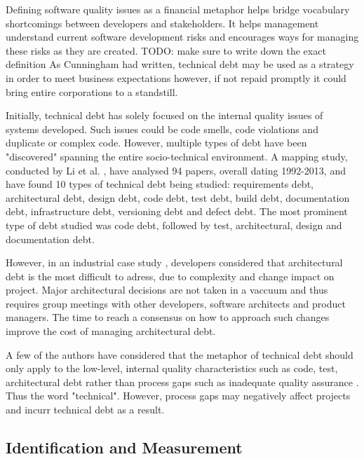 \documentclass{mprop}
\begin{document}
Defining software quality issues as a financial metaphor helps bridge vocabulary
shortcomings between developers and stakeholders. It helps management understand
current software development risks and encourages ways for managing these risks
as they are created. TODO: make sure to write down the exact definition As
Cunningham \cite{Cunningham1993} had written, technical debt may be used as a
strategy in order to meet business expectations however, if not repaid promptly
it could bring entire corporations to a standstill.

Initially, technical debt has solely focused on the internal quality issues of
systems developed. Such issues could be code smells, code violations and
duplicate or complex code. However, multiple types of debt have been
"discovered" spanning the entire socio-technical environment.
A mapping study, conducted by Li et al. \cite{Li2015}, have analysed 94 papers,
overall dating 1992-2013, and have found 10 types of technical debt being
studied: requirements debt, architectural debt, design debt, code debt, test
debt, build debt, documentation debt, infrastructure debt, versioning debt and
defect debt. The most prominent type of debt studied was code debt, followed by test,
architectural, design and documentation debt.

However, in an industrial case study \cite{Codabux2013}, developers considered that
architectural debt is the most difficult to adress, due to complexity and change
impact on project. Major architectural decisions are not taken in a vaccuum and
thus requires group meetings with other developers, software architects and
product managers. The time to reach a consensus on how to approach such changes
improve the cost of managing architectural debt.

A few of the authors have considered that the metaphor of technical debt should
only apply to the low-level, internal quality characteristics such as code,
test, architectural debt rather than process gaps such as inadequate quality
assurance \cite{Theodoropoulos2011} \cite{Nugroho2011}. Thus the word
"technical". However, process gaps may negatively affect projects and incurr
technical debt as a result.

\subsection{Identification and Measurement}
\end{document}
